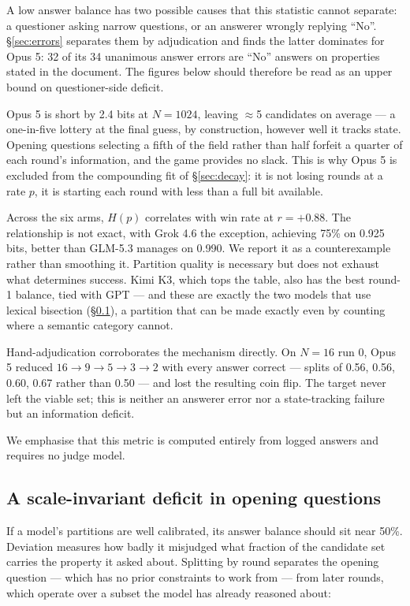\documentclass[11pt]{article}
\begin{document}
A low answer balance has two possible causes that this statistic cannot
separate: a questioner asking narrow questions, or an answerer wrongly replying
``No''. \S\ref{sec:errors} separates them by adjudication and finds the latter
dominates for Opus 5: 32 of its 34 unanimous answer errors are ``No'' answers on
properties stated in the document. The figures below should therefore be read
as an upper bound on questioner-side deficit.

Opus 5 is short by 2.4 bits at $N=1024$, leaving $\approx$5 candidates on average
--- a one-in-five lottery at the final guess, by construction, however well it
tracks state. Opening questions selecting a fifth of the field rather than half
forfeit a quarter of each round's information, and the game provides no slack.
This is why Opus 5 is excluded from the compounding fit of \S\ref{sec:decay}: it
is not losing rounds at a rate $p$, it is starting each round with less than a
full bit available.

Across the six arms, $H(p)$ correlates with win rate at $r=+0.88$. The
relationship is not exact, with Grok 4.6 the exception, achieving 75\% on 0.925 bits,
better than GLM-5.3 manages on 0.990. We report it as a counterexample rather
than smoothing it. Partition quality is necessary but does not exhaust what
determines success. Kimi K3, which tops the table, also has the
best round-1 balance, tied with GPT --- and these are exactly the two models
that use lexical bisection (\S\ref{sec:aggregation}), a partition that can be
made exactly even by counting where a semantic category cannot.

Hand-adjudication corroborates the mechanism directly. On $N{=}16$ run 0, Opus 5
reduced $16 \to 9 \to 5 \to 3 \to 2$ with every answer correct --- splits of
0.56, 0.56, 0.60, 0.67 rather than 0.50 --- and lost the resulting coin flip.
The target never left the viable set; this is neither an answerer error nor a
state-tracking failure but an information deficit.

We emphasise that this metric is computed entirely from logged answers and
requires no judge model.

\subsection{A scale-invariant deficit in opening questions}
\label{sec:aggregation}

If a model's partitions are well calibrated, its answer balance should sit near
50\%. Deviation measures how badly it misjudged what fraction of the candidate
set carries the property it asked about. Splitting by round separates the
opening question --- which has no prior constraints to work from --- from later
rounds, which operate over a subset the model has already reasoned about:
\end{document}
